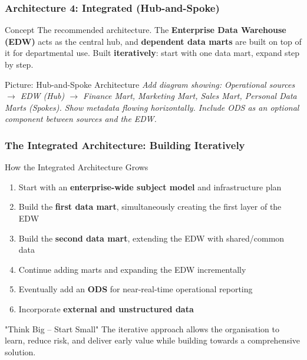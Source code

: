 \begin{frame}
  \frametitle{Architecture 4: Integrated (Hub-and-Spoke)}

  \begin{block}{Concept}
    The recommended architecture. The \textbf{Enterprise Data Warehouse (EDW)}
    acts as the central hub, and \textbf{dependent data marts} are built
    on top of it for departmental use.
    Built \textbf{iteratively}: start with one data mart, expand step by step.
  \end{block}

  \begin{alertblock}{Picture: Hub-and-Spoke Architecture}
    \textit{Add diagram showing: Operational sources $\to$ EDW (Hub) $\to$
    Finance Mart, Marketing Mart, Sales Mart, Personal Data Marts (Spokes).
    Show metadata flowing horizontally. Include ODS as an optional component
    between sources and the EDW.}
  \end{alertblock}
\end{frame}

\begin{frame}
  \frametitle{The Integrated Architecture: Building Iteratively}

  \begin{block}{How the Integrated Architecture Grows}
    \begin{enumerate}
      \item Start with an \textbf{enterprise-wide subject model} and
        infrastructure plan
      \item Build the \textbf{first data mart}, simultaneously creating
        the first layer of the EDW
      \item Build the \textbf{second data mart}, extending the EDW with
        shared/common data
      \item Continue adding marts and expanding the EDW incrementally
      \item Eventually add an \textbf{ODS} for near-real-time operational reporting
      \item Incorporate \textbf{external and unstructured data}
    \end{enumerate}
  \end{block}

  \begin{block}{"Think Big -- Start Small"}
    The iterative approach allows the organisation to learn, reduce risk,
    and deliver early value while building towards a comprehensive solution.
  \end{block}
\end{frame}

